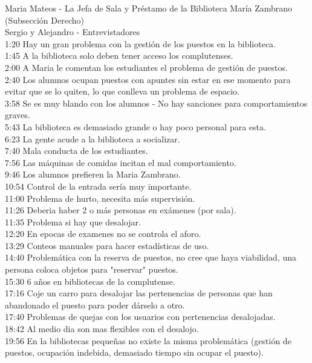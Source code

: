 \documentclass[12pt]{article}
\begin{document}
Maria Mateos - La Jefa de Sala y Préstamo de la Biblioteca María Zambrano (Subsección Derecho)\\
Sergio y Alejandro - Entrevistadores  \\
1:20 Hay un gran problema con la gestión de los puestos en la biblioteca.\\
1:45 A la biblioteca solo deben tener acceso los complutenses.\\
2:00 A Maria le comentan los estudiantes el problema de gestión de puestos.\\
2:40 Los alumnos ocupan puestos con apuntes sin estar en ese momento para evitar que se lo quiten, lo que conlleva un problema de espacio.\\
3:58 Se es muy blando con los alumnos - No hay sanciones para comportamientos graves.\\
5:43 La biblioteca es demasiado grande o hay poco personal para esta.\\
6:23 La gente acude a la biblioteca a socializar.\\
7:40 Mala conducta de los estudiantes.\\
7:56 Las máquinas de comidas incitan el mal comportamiento.\\
9:46 Los alumnos prefieren la Maria Zambrano.\\
10:54 Control de la entrada sería muy importante.\\
11:00 Problema de hurto, necesita más supervisión.\\
11:26 Deberia haber 2 o más personas en  exámenes (por sala).\\
11:35 Problema si hay que desalojar.\\
12:20 En epocas de examenes no se controla el aforo.\\
13:29 Conteos manuales para hacer estadísticas de uso.\\
14:40 Problemática con la reserva de puestos, no cree que haya viabilidad, una persona coloca objetos para "reservar" puestos.\\
15:30 6 años en bibliotecas de la complutense.\\
17:16 Coje un carro para desalojar las pertenencias de personas que han abandonado el puesto para poder dárselo a otro.\\
17:40 Problemas de quejas con los usuarios con pertenencias desalojadas.\\
18:42 Al medio dia son mas flexibles con el desalojo.\\
19:56 En la bibliotecas pequeñas no existe la misma problemática (gestión de puestos, ocupación indebida, demasiado tiempo sin ocupar el puesto).\\
\end{document}
